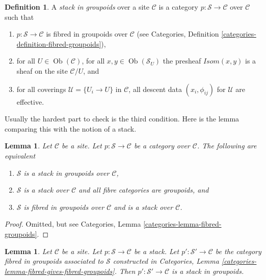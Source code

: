 \documentclass{stacks-project}
\theoremstyle{plain}
\newtheorem{lemma}[subsection]{Lemma}
\theoremstyle{definition}
\newtheorem{definition}[subsection]{Definition}
\theoremstyle{remark}
\numberwithin{equation}{subsection}
\def\Ob{\mathop{\mathrm{Ob}}\nolimits}
\begin{document}
\begin{definition}
\label{definition-stack-in-groupoids}
A {\it stack in groupoids} over a site $\mathcal{C}$ is a
category $p : \mathcal{S} \to \mathcal{C}$ over $\mathcal{C}$
such that
\begin{enumerate}
\item $p : \mathcal{S} \to \mathcal{C}$ is fibred
in groupoids over $\mathcal{C}$ (see
Categories, Definition \ref{categories-definition-fibred-groupoids}),
\item for all $U \in \Ob(\mathcal{C})$,
for all $x, y\in \Ob(\mathcal{S}_U)$ the presheaf
$\mathit{Isom}(x, y)$ is a sheaf on the site $\mathcal{C}/U$, and
\item for all coverings $\mathcal{U} = \{U_i \to U\}$ in $\mathcal{C}$,
all descent data $(x_i, \phi_{ij})$ for $\mathcal{U}$ are effective.
\end{enumerate}
\end{definition}

\noindent
Usually the hardest part to check is the third condition.
Here is the lemma comparing this with the notion of a stack.

\begin{lemma}
\label{lemma-stack-in-groupoids-stack}
Let $\mathcal{C}$ be a site.
Let $p : \mathcal{S} \to \mathcal{C}$ be a category over $\mathcal{C}$.
The following are equivalent
\begin{enumerate}
\item $\mathcal{S}$ is a stack in groupoids over $\mathcal{C}$,
\item $\mathcal{S}$ is a stack over $\mathcal{C}$ and all
fibre categories are groupoids, and
\item $\mathcal{S}$ is fibred in groupoids over $\mathcal{C}$
and is a stack over $\mathcal{C}$.
\end{enumerate}
\end{lemma}

\begin{proof}
Omitted, but see Categories, Lemma \ref{categories-lemma-fibred-groupoids}.
\end{proof}

\begin{lemma}
\label{lemma-stack-gives-stack-groupoids}
Let $\mathcal{C}$ be a site.
Let $p : \mathcal{S} \to \mathcal{C}$ be a stack.
Let $p' : \mathcal{S}' \to \mathcal{C}$
be the category fibred in groupoids associated to $\mathcal{S}$
constructed in
Categories, Lemma \ref{categories-lemma-fibred-gives-fibred-groupoids}.
Then $p' : \mathcal{S}' \to \mathcal{C}$ is a stack in groupoids.
\end{lemma}
\end{document}

